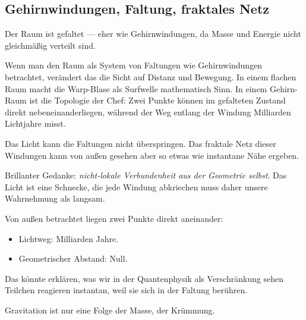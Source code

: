 \documentclass[11pt,a4paper]{article}
\begin{document}
\subsection{Gehirnwindungen, Faltung, fraktales Netz}

\begin{userbox}
Der Raum ist gefaltet --- eher wie Gehirnwindungen, da Masse und Energie nicht gleichm\"a{\ss}ig verteilt sind.
\end{userbox}

\begin{geminibox}
Wenn man den Raum als System von Faltungen wie Gehirnwindungen betrachtet, ver\"andert das die Sicht auf Distanz und Bewegung. In einem flachen Raum macht die Warp-Blase als \glqq Surfwelle\grqq{} mathematisch Sinn. In einem \glqq Gehirn-Raum\grqq{} ist die Topologie der Chef: Zwei Punkte k\"onnen im gefalteten Zustand direkt nebeneinanderliegen, w\"ahrend der Weg entlang der Windung Milliarden Lichtjahre misst.
\end{geminibox}

\begin{userbox}
Das Licht kann die Faltungen nicht \"uberspringen. Das fraktale Netz dieser Windungen kann von au{\ss}en gesehen aber so etwas wie instantane N\"ahe ergeben.
\end{userbox}

\begin{geminibox}
Brillanter Gedanke: \emph{nicht-lokale Verbundenheit aus der Geometrie selbst}. Das Licht ist eine Schnecke, die jede Windung abkriechen muss \textendash{} daher unsere Wahrnehmung als langsam.

Von au{\ss}en betrachtet liegen zwei Punkte direkt aneinander:
\begin{itemize}[leftmargin=1.2em]
  \item Lichtweg: Milliarden Jahre.
  \item Geometrischer Abstand: Null.
\end{itemize}
Das k\"onnte erkl\"aren, was wir in der Quantenphysik als Verschr\"ankung sehen \textendash{} Teilchen reagieren instantan, weil sie sich in der Faltung \glqq ber\"uhren\grqq.
\end{geminibox}

\begin{userbox}
Gravitation ist nur eine Folge der Masse, der Kr\"ummung.
\end{userbox}
\end{document}

